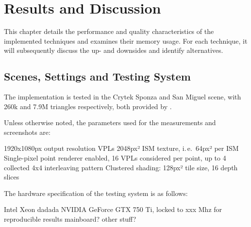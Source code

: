 

\chapter{Results and Discussion}
\label{chap:results}

This chapter details the performance and quality characteristics of the implemented techniques and  examines their memory usage. For each technique, it will subsequently discuss the up- and downsides and identify alternatives.

\section{Scenes, Settings and Testing System}

The implementation is tested in the Crytek Sponza and San Miguel scene, with 260k and 7.9M triangles respectively, both provided by \citet{McGuire2011Data}.

Unless otherwise noted, the parameters used for the measurements and screenshots are:
\begin{outline}
    \1 1920x1080px output resolution
     VPLs
    \1 2048px² ISM texture, i.\,e.\ 64px² per ISM
    \1 Single-pixel point renderer enabled, 16 VPLs considered per point, up to 4 collected
    \1 4x4 interleaving pattern
    \1 Clustered shading: 128px² tile size, 16 depth slices
\end{outline}

\noindent
The hardware specification of the testing system is as follows:
\begin{outline}
    \1 Intel Xeon dadada
    \1 NVIDIA GeForce GTX 750 Ti, locked to xxx Mhz for reproducible results
    \1 mainboard?
    \1 other stuff?
\end{outline}


